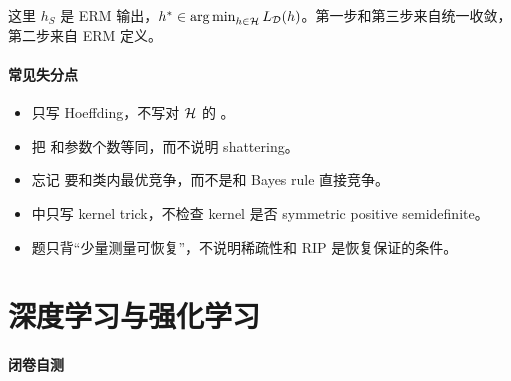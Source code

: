 这里 \(h_S\) 是 ERM 输出，\(h^*\in\operatorname*{arg\,min}_{h\in\mathcal{H}}L_{\mathcal{D}}(h)\)。第一步和第三步来自统一收敛，第二步来自 ERM 定义。

\paragraph{常见失分点}

\begin{itemize}
  \item 只写 Hoeffding，不写对 \(\mathcal{H}\) 的 。
  \item 把 和参数个数等同，而不说明 shattering。
  \item 忘记 要和类内最优竞争，而不是和 Bayes rule 直接竞争。
  \item {}中只写 kernel trick，不检查 kernel 是否 symmetric positive semidefinite。
  \item {}题只背“少量测量可恢复”，不说明稀疏性和 RIP 是恢复保证的条件。
\end{itemize}

\section{深度学习与强化学习}


\paragraph{闭卷自测}

